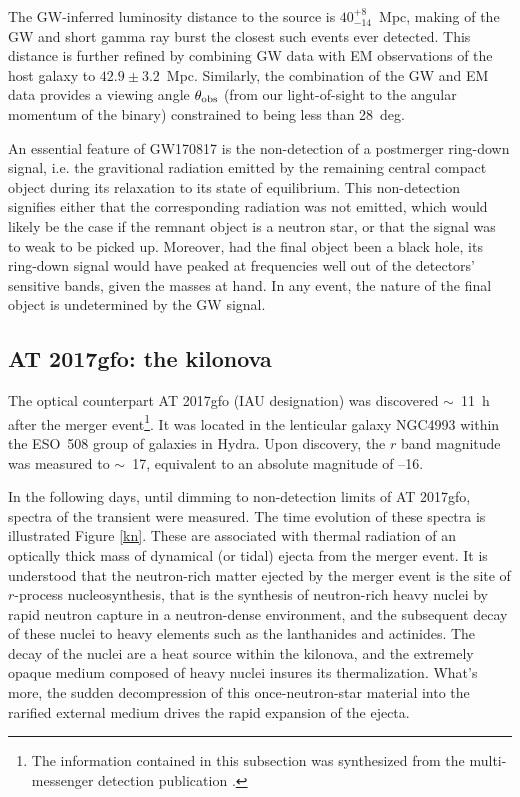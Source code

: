 The GW-inferred luminosity distance to the source is $40_{-14}^{+8}$~Mpc, making of the GW and short gamma ray burst the closest such events ever detected. This distance is further refined by combining GW data with EM observations of the host galaxy to $42.9\pm3.2$~Mpc. Similarly, the combination of the GW and EM data provides a viewing angle $\theta_{\mathrm{obs}}$ (from our light-of-sight to the angular momentum of the binary) constrained to being less than 28~deg.

An essential feature of GW170817 is the non-detection of a postmerger ring-down signal, i.e. the gravitional radiation emitted by the remaining central compact object during its relaxation to its state of equilibrium. This non-detection signifies either that the corresponding radiation was not emitted, which would likely be the case if the remnant object is a neutron star, or that the signal was to weak to be picked up. Moreover, had the final object been a black hole, its ring-down signal would have peaked at frequencies well out of the detectors' sensitive bands, given the masses at hand. In any event, the nature of the final object is undetermined by the GW signal.



\subsection{AT 2017gfo: the kilonova}
\label{kilonova}
The optical counterpart AT 2017gfo (IAU designation) was discovered $\sim$~11~h after the merger event\footnote{The information contained in this subsection was synthesized from the multi-messenger detection publication \cite{51}.}. It was located in the lenticular galaxy NGC4993 within the ESO~508 group of galaxies in Hydra. Upon discovery, the $r$ band magnitude was measured to $\sim$~17, equivalent to an absolute magnitude of --16.

In the following days, until dimming to non-detection limits of AT 2017gfo, spectra of the transient were measured. The time evolution of these spectra is illustrated Figure \ref{kn}. These are associated with thermal radiation of an optically thick mass of dynamical (or tidal) ejecta from the merger event. It is understood that the neutron-rich matter ejected by the merger event is the site of $r$-process nucleosynthesis, that is the synthesis of neutron-rich heavy nuclei by rapid neutron capture in a neutron-dense environment, and the subsequent decay of these nuclei to heavy elements such as the lanthanides and actinides. The decay of the nuclei are a heat source within the kilonova, and the extremely opaque medium composed of heavy nuclei insures its thermalization. What's more, the sudden decompression of this once-neutron-star material into the rarified external medium drives the rapid expansion of the ejecta.

